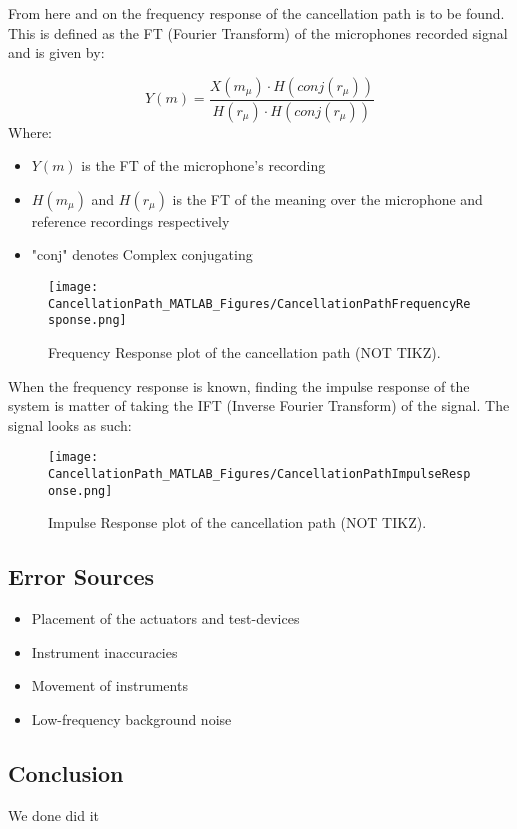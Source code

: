 From here and on the frequency response of the cancellation path is to be found. This is defined as the FT (Fourier Transform) of the microphones recorded signal and is given by:

\begin{equation}
\label{FrequencyResponseEq}
Y(m) = \frac{X(m_{\mu}) \cdot  H(conj(r_{\mu}))}{H(r_{\mu}) \cdot  H(conj(r_{\mu}))}
\end{equation}
Where:
\begin{itemize}
	\item $Y(m)$ is the FT of the microphone's recording
	\item $H(m_{\mu})$ and $H(r_{\mu})$ is the FT of the meaning over the microphone and reference recordings respectively
	\item "conj" denotes Complex conjugating
\end{itemize}

\begin{figure}[H]
	\centering
	\texttt{[image: CancellationPath\_MATLAB\_Figures/CancellationPathFrequencyResponse.png]}
	\caption{Frequency Response plot of the cancellation path (NOT TIKZ).}
	\label{FrequencyResponsePlotCancellationPath}
\end{figure}

When the frequency response is known, finding the impulse response of the system is matter of taking the IFT (Inverse Fourier Transform) of the signal.
The signal looks as such:

\begin{figure}[H]
	\centering
	\texttt{[image: CancellationPath\_MATLAB\_Figures/CancellationPathImpulseResponse.png]}
	\caption{Impulse Response plot of the cancellation path (NOT TIKZ).}
	\label{CancellationPathImpulseResponse}
\end{figure}

\subsection{Error Sources}
\begin{itemize}
	\item Placement of the actuators and test-devices
	\item Instrument inaccuracies 
	\item Movement of instruments
	\item Low-frequency background noise
\end{itemize}

\subsection{Conclusion}
We done did it
